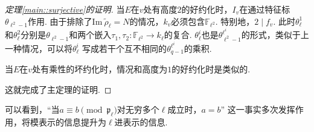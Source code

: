 \begin{proof}[定理\ref{main::surjective}的证明]
    当$E$在$v$处有高度$2$的好约化时，$I_v$在通过特征标$\theta_{\ell^2-1}$作用. 由于排除了$\mathrm{Im}\ \tilde{\rho}_{\ell} = N$的情况，$k_v$必须包含$\mathbb{F}_{\ell^2}$. 特别地，$2\mid f_v$.
    此时$\theta_{\ell}^1$和$\theta_{\ell}^2$分别是$\theta_{\ell^2-1}$和两个嵌入$\tau_1,\tau_2:\mathbb{F}_{\ell^2}\to k_{\ell}$的复合.
    $\theta_{\ell}^{i}$也是$\theta_{\ell^2 - 1}^{\ell^i}$的形式，类似于上一种情况，可以将$\theta_{\ell}^{i}$
    写成若干个互不相同的$\theta_{q-1}^{\ell^i}$的乘积.

    当$E$在$v$处有乘性的坏约化时，情况和高度为$1$的好约化时是类似的.

    这就完成了主定理的证明.
\end{proof}

\begin{crem}
    可以看到，“当$a\equiv b\pmod{\mathfrak{p}_{\ell}}$对无穷多个$\ell$成立时，$a=b$”
    这一事实多次发挥作用，将模表示的信息提升为$\ell$进表示的信息.
\end{crem}
